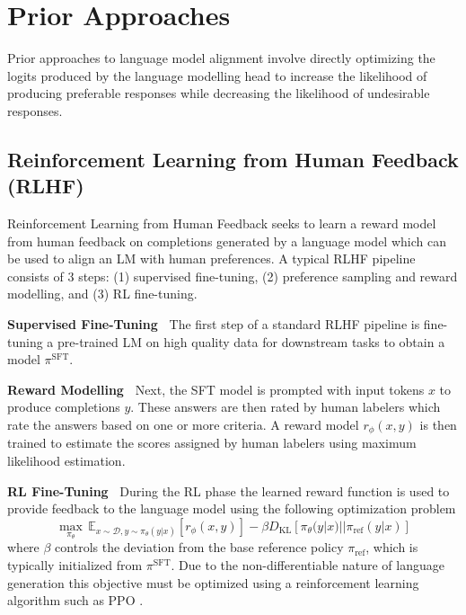 \section{Prior Approaches}
Prior approaches to language model alignment involve directly optimizing the logits produced by the language modelling head to increase the likelihood of producing preferable responses while decreasing the likelihood of undesirable responses. %

\subsection{Reinforcement Learning from Human Feedback (RLHF)}
Reinforcement Learning from Human Feedback seeks to learn a reward model from human feedback on completions generated by a language model which can be used to align an LM with human preferences. A typical RLHF pipeline consists of 3 steps: (1) supervised fine-tuning, (2) preference sampling and reward modelling, and (3) RL fine-tuning.

\textbf{Supervised Fine-Tuning\ } The first step of a standard RLHF pipeline is fine-tuning a pre-trained LM on high quality data for downstream tasks to obtain a model $\pi^\text{SFT}$.

\textbf{Reward Modelling\ } Next, the SFT model is prompted with input tokens $x$ to produce completions $y$. These answers are then rated by human labelers which rate the answers based on one or more criteria. A reward model $r_\phi(x,y)$ is then trained to estimate the scores assigned by human labelers using maximum likelihood estimation.

\textbf{RL Fine-Tuning\ } During the RL phase the learned reward function is used to provide feedback to the language model using the following optimization problem
\begin{equation} \label{eq:rl-objective}
    \underset{\pi_\theta}{\max}\, \mathbb{E}_{x \sim \mathcal{D},y \sim \pi_\theta(y|x)}
    \left[ r_\phi(x,y) \right]
    - \beta D_{\text{KL}}\left[ \pi_\theta(y|x)||\pi_\text{ref}(y|x) \right]
\end{equation}
where $\beta$ controls the deviation from the base reference policy $\pi_{\text{ref}}$, which is typically initialized from $\pi^\text{SFT}$. Due to the non-differentiable nature of language generation this objective must be optimized using a reinforcement learning algorithm such as PPO \cite{schulman2017proximal}.

